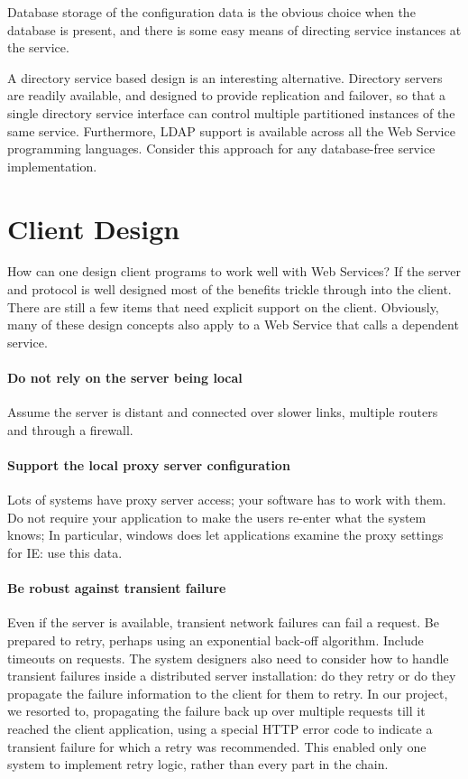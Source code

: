 \documentclass[draft]{report}
\begin{document}
Database storage of the configuration data is the obvious choice when
the database is present, and there is some easy means of directing
service instances at the service.

A directory service based design is an interesting alternative.
Directory servers are readily available, and designed to provide
replication and failover, so that a single directory service interface
can control multiple partitioned instances of the same service.
Furthermore, LDAP support is available across all the Web Service
programming languages. Consider this approach for any database-free
service implementation.

\chapter{Client Design}

How can one design client programs to work well with Web Services? If
the server and protocol is well designed most of the benefits trickle
through into the client. There are still a few items that need explicit
support on the client. Obviously, many of these design concepts also
apply to a Web Service that calls a dependent service.

\subsubsection{Do not rely on the server being local}

Assume the server is distant and connected over slower links, multiple
routers and through a firewall.

\subsubsection{Support the local proxy server configuration}

Lots of systems have proxy server access; your software has to work with
them. Do not require your application to make the users re-enter what
the system knows; In particular, windows does let applications examine
the proxy settings for IE: use this data.

\subsubsection{Be robust against transient failure}

Even if the server is available, transient network failures can fail a
request. Be prepared to retry, perhaps using an exponential back-off
algorithm. Include timeouts on requests. The system designers also need
to consider how to handle transient failures inside a distributed server
installation: do they retry or do they propagate the failure information
to the client for them to retry. In our project, we resorted to,
propagating the failure back up over multiple requests till it reached
the client application, using a special HTTP error code to indicate a
transient failure for which a retry was recommended. This enabled only
one system to implement retry logic, rather than every part in the
chain.
\end{document}
